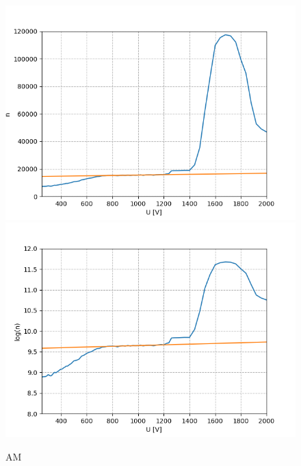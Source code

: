 \documentclass[12pt,a4paper]{article}
\begin{document}
\begin{figure}
\centering
\includegraphics[scale=0.8]{Bilder/Prop/Am_lin.PNG}
\includegraphics[scale=0.8]{Bilder/Prop/Am_log.PNG}
\caption{AM}
\label{fig:amlin}
\end{figure}
\end{document}
